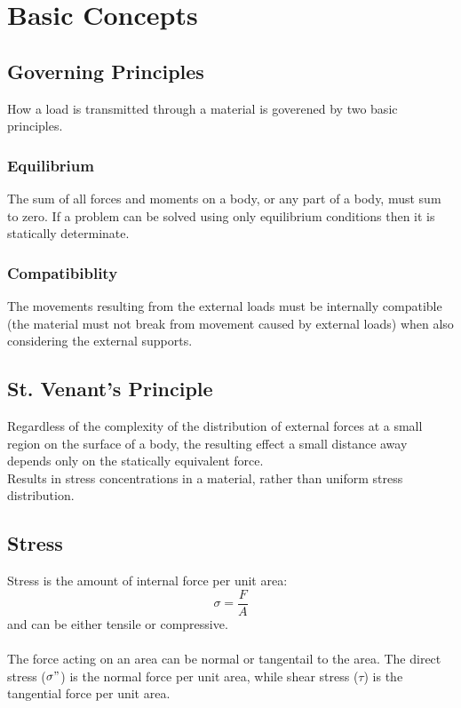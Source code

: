 \documentclass[12pt,a4paper]{article}
\begin{document}
\newpage

\section{Basic Concepts}
    \subsection{Governing Principles}
        How a load is transmitted through a material is goverened by two basic principles. 
        \subsubsection{Equilibrium}
            The sum of all forces and moments on a body, or any part of a body, must sum to zero. If a problem can be solved using only equilibrium conditions then it is statically determinate.

        \subsubsection{Compatibiblity}
            The movements resulting from the external loads must be internally compatible (the material must not break from movement caused by external loads) when also considering the external supports.

    \subsection{St. Venant's Principle}
        Regardless of the complexity of the distribution of external forces at a small region on the surface of a body, the resulting effect a small distance away depends only on the statically equivalent force. \\
        Results in stress concentrations in a material, rather than uniform stress distribution. \\

    \subsection{Stress}
        Stress is the amount of internal force per unit area:
        \[\sigma = \frac{F}{A}\]
        and can be either tensile or compressive. \\
        \\
        The force acting on an area can be normal or tangentail to the area. The direct stress ($\sigma"$) is the normal force per unit area, while shear stress ($\tau$) is the tangential force per unit area.
\end{document}
